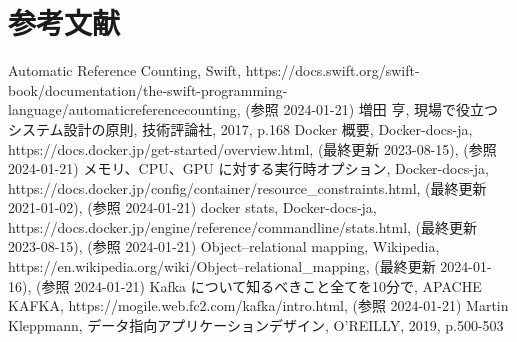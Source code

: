 \documentclass[../../main]{subfiles}
\begin{document}
    \section{参考文献}\label{sec:reference}

    \begin{thebibliography}{99}
         Automatic Reference Counting, Swift, https://docs.swift.org/swift-book/documentation/the-swift-programming-language/automaticreferencecounting, (参照 2024-01-21)
         増田 亨, 現場で役立つシステム設計の原則, 技術評論社, 2017, p.168
         Docker 概要, Docker-docs-ja, https://docs.docker.jp/get-started/overview.html, (最終更新 2023-08-15), (参照 2024-01-21)
         メモリ、CPU、GPU に対する実行時オプション, Docker-docs-ja, https://docs.docker.jp/config/container/resource\_constraints.html, (最終更新 2021-01-02), (参照 2024-01-21)
         docker stats, Docker-docs-ja, https://docs.docker.jp/engine/reference/commandline/stats.html, (最終更新 2023-08-15), (参照 2024-01-21)
         Object–relational mapping, Wikipedia, https://en.wikipedia.org/wiki/Object–relational\_mapping, (最終更新 2024-01-16), (参照 2024-01-21)
         Kafka について知るべきこと全てを10分で, APACHE KAFKA, https://mogile.web.fc2.com/kafka/intro.html, (参照 2024-01-21)
         Martin Kleppmann, データ指向アプリケーションデザイン, O'REILLY, 2019, p.500-503
    \end{thebibliography}

    \clearpage
\end{document}
